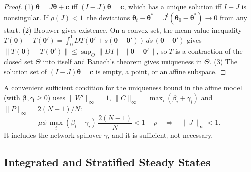 \documentclass[../structural_economics_book.tex]{subfiles}
\begin{document}
\begin{proof}
(1) $\boldsymbol{\theta} = J\boldsymbol{\theta} + \mathbf{c}$ iff $(I - J)\boldsymbol{\theta} = \mathbf{c}$, which has a unique solution iff $I - J$ is nonsingular. If $\rho(J) < 1$, the deviations $\boldsymbol{\theta}_t - \boldsymbol{\theta}^* = J^t(\boldsymbol{\theta}_0 - \boldsymbol{\theta}^*) \to 0$ from any start. (2) Brouwer gives existence. On a convex set, the mean-value inequality $T(\boldsymbol{\theta}) - T(\boldsymbol{\theta}') = \int_0^1 DT(\boldsymbol{\theta}' + s(\boldsymbol{\theta} - \boldsymbol{\theta}'))\,ds\,(\boldsymbol{\theta} - \boldsymbol{\theta}')$ gives $\|T(\boldsymbol{\theta}) - T(\boldsymbol{\theta}')\| \leq \sup_\Theta\|DT\|\,\|\boldsymbol{\theta} - \boldsymbol{\theta}'\|$, so $T$ is a contraction of the closed set $\Theta$ into itself and Banach's theorem gives uniqueness in $\Theta$. (3) The solution set of $(I-J)\boldsymbol{\theta} = \mathbf{c}$ is empty, a point, or an affine subspace.
\end{proof}

A convenient sufficient condition for the uniqueness bound in the affine model (with $\boldsymbol{\beta}, \boldsymbol{\gamma} \ge 0$) uses $\|W^I\|_\infty = 1$, $\|C\|_\infty = \max_i(\beta_i + \gamma_i)$ and $\|P\|_\infty = 2(N-1)/N$:
\begin{equation}\label{ch10:eq:contraction}
\mu\phi\,\max_i(\beta_i + \gamma_i)\,\frac{2(N-1)}{N} < 1 - \rho \quad\Longrightarrow\quad \|J\|_\infty < 1.
\end{equation}
It includes the network spillover $\gamma$, and it is sufficient, not necessary.


\subsection{Integrated and Stratified Steady States}
\end{document}

